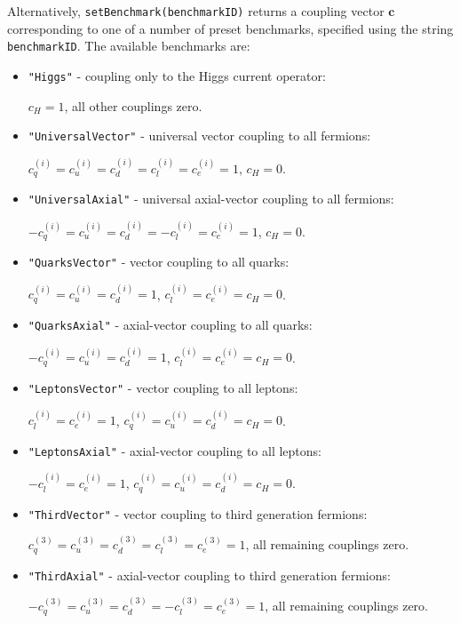 \documentclass[notitlepage,12pt]{article}
\begin{document}
Alternatively, \texttt{setBenchmark(benchmarkID)} returns a coupling vector $\mathbf{c}$ corresponding to one of a number of preset benchmarks, specified using the string \texttt{benchmarkID}. The available benchmarks are:

\begin{itemize}

\item \texttt{"Higgs"} - coupling only to the Higgs current operator: 

\qquad $c_H = 1$, all other couplings zero.

\item \texttt{"UniversalVector"} - universal vector coupling to all fermions: 

\qquad $c_q^{(i)} = c_u^{(i)} = c_d^{(i)} = c_l^{(i)} = c_e^{(i)} = 1$, $c_H = 0$.

\item \texttt{"UniversalAxial"} - universal axial-vector coupling to all fermions: 

\qquad $-c_q^{(i)} = c_u^{(i)} = c_d^{(i)} = -c_l^{(i)} = c_e^{(i)} = 1$, $c_H = 0$.

\item \texttt{"QuarksVector"} - vector coupling to all quarks: 

\qquad $c_q^{(i)} = c_u^{(i)} = c_d^{(i)} = 1$, $c_l^{(i)} = c_e^{(i)} = c_H = 0$.

\item \texttt{"QuarksAxial"} - axial-vector coupling to all quarks: 

\qquad $-c_q^{(i)} = c_u^{(i)} = c_d^{(i)} = 1$, $c_l^{(i)} = c_e^{(i)} = c_H = 0$.

\item \texttt{"LeptonsVector"} - vector coupling to all leptons: 

\qquad $c_l^{(i)} = c_e^{(i)} = 1$, $c_q^{(i)} = c_u^{(i)} = c_d^{(i)} = c_H = 0$.

\item \texttt{"LeptonsAxial"} - axial-vector coupling to all leptons: 

\qquad $-c_l^{(i)} = c_e^{(i)} = 1$, $c_q^{(i)} = c_u^{(i)} = c_d^{(i)} = c_H = 0$.

\item \texttt{"ThirdVector"} - vector coupling to third generation fermions: 

\qquad $c_q^{(3)} = c_u^{(3)} = c_d^{(3)} = c_l^{(3)} = c_e^{(3)} = 1$, all remaining couplings zero.

\item \texttt{"ThirdAxial"} - axial-vector coupling to third generation fermions: 

\qquad $-c_q^{(3)} = c_u^{(3)} = c_d^{(3)} = -c_l^{(3)} = c_e^{(3)} = 1$, all remaining couplings zero.

\end{itemize}
\end{document}
